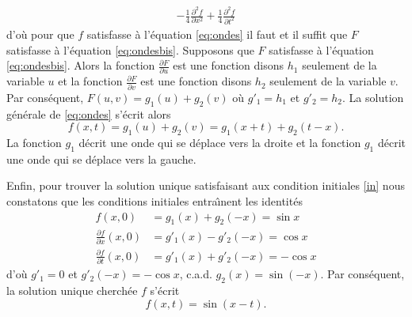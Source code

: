 {{\begin{align*}
-\frac 14\frac{\partial^2 f}{\partial x^2}
+\frac 14\frac{\partial^2 f}{\partial t^2}
\end{align*}
d'o\`u pour que $f$ satisfasse \`a l'\'equation \eqref{eq:ondes} il faut et il suffit que $F$ satisfasse \`a l'\'equation
 \eqref{eq:ondesbis}.
Supposons que $F$ satisfasse \`a l'\'equation \eqref{eq:ondesbis}.
Alors la fonction $\frac{\partial F}{\partial u}$ est une fonction
disons $h_1$ seulement de la variable $u$
et la fonction $\frac{\partial F}{\partial v}$ est une fonction
disons $h_2$ seulement de la variable $v$.
Par cons\'equent,
$F(u,v)= g_1(u)+g_2(v)$ o\`u $g'_1=h_1$ et $g'_2=h_2$.
La solution g\'en\'erale de
\eqref{eq:ondes} s'\'ecrit alors
\[
f(x,t)=g_1(u)+g_2(v)=g_1(x+t)+g_2(t-x) .
\]
La fonction $g_1$ d\'ecrit
une onde qui se d\'eplace vers la droite et 
la fonction $g_1$ d\'ecrit
une onde qui se d\'eplace vers la gauche.

Enfin, pour trouver la solution unique
satisfaisant aux condition initiales \eqref{in} nous constatons que
les conditions initiales entra\^ \i nent les identit\'es
\begin{align*}
f(x,0)&=g_1(x)+g_2(-x)=\sin x
\\
\frac {\partial f}{\partial x}(x,0)&=g'_1(x)-g'_2(-x)=\cos x
\\
\frac {\partial f}{\partial t}(x,0)&=g'_1(x)+g'_2(-x)=-\cos x
\end{align*}
d'o\`u $g'_1=0$ et $g'_2(-x)=-\cos x$, c.a.d. 
$g_2(x)=\sin (-x)$. Par cons\'equent,
la solution unique cherch\'ee $f$ s'\'ecrit
\[
f(x,t)= \sin(x-t).
\]
}
}
